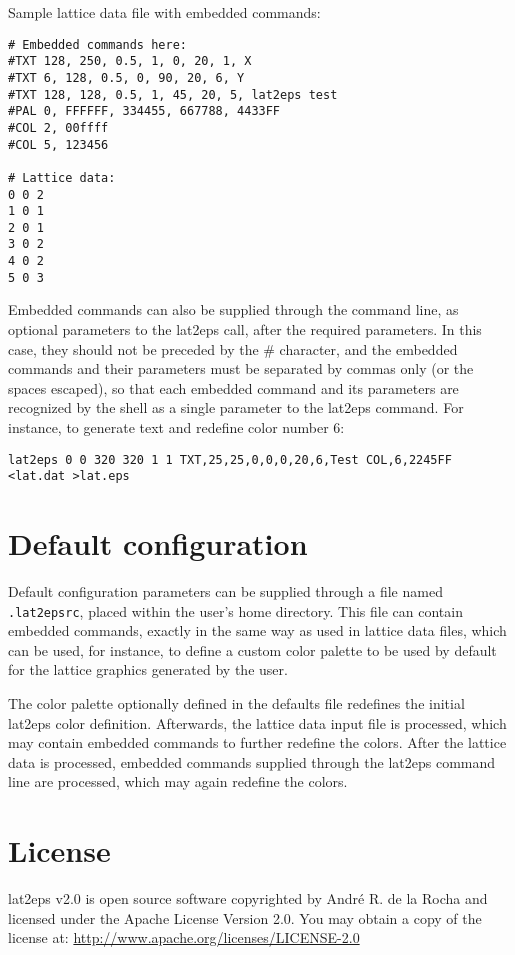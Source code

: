\documentclass[a4paper]{article}
\begin{document}
Sample lattice data file with embedded commands:
\bigbreak

\begin{lstlisting}[frame=single]
# Embedded commands here:
#TXT 128, 250, 0.5, 1, 0, 20, 1, X
#TXT 6, 128, 0.5, 0, 90, 20, 6, Y
#TXT 128, 128, 0.5, 1, 45, 20, 5, lat2eps test
#PAL 0, FFFFFF, 334455, 667788, 4433FF
#COL 2, 00ffff
#COL 5, 123456

# Lattice data:
0 0 2
1 0 1
2 0 1
3 0 2
4 0 2
5 0 3
\end{lstlisting}

\bigbreak

Embedded commands can also be supplied through the command line, as optional parameters to the lat2eps call, after the required parameters. In this case, they should not be preceded by the \# character, and the embedded commands and their parameters must be separated by commas only (or the spaces escaped), so that each embedded command and its parameters are recognized by the shell as a single parameter to the lat2eps command. For instance, to generate text and redefine color number 6:
\bigbreak

\texttt{lat2eps 0 0 320 320 1 1 TXT,25,25,0,0,0,20,6,Test COL,6,2245FF <lat.dat >lat.eps}
\bigbreak


\section{Default configuration}

Default configuration parameters can be supplied through a file named \texttt{.lat2epsrc}, placed within the user's home directory. This file can contain embedded commands, exactly in the same way as used in lattice data files, which can be used, for instance, to define a custom color palette to be used by default for the lattice graphics generated by the user.
\bigbreak

The color palette optionally defined in the defaults file redefines the initial lat2eps color definition. Afterwards, the lattice data input file is processed, which may contain embedded commands to further redefine the colors. After the lattice data is processed, embedded commands supplied through the lat2eps command line are processed, which may again redefine the colors.
\bigbreak


\section{License}

lat2eps v2.0 is open source software copyrighted by André R. de la Rocha and licensed under the Apache License Version 2.0. You may obtain a copy of the license at: \url{http://www.apache.org/licenses/LICENSE-2.0}
\end{document}
